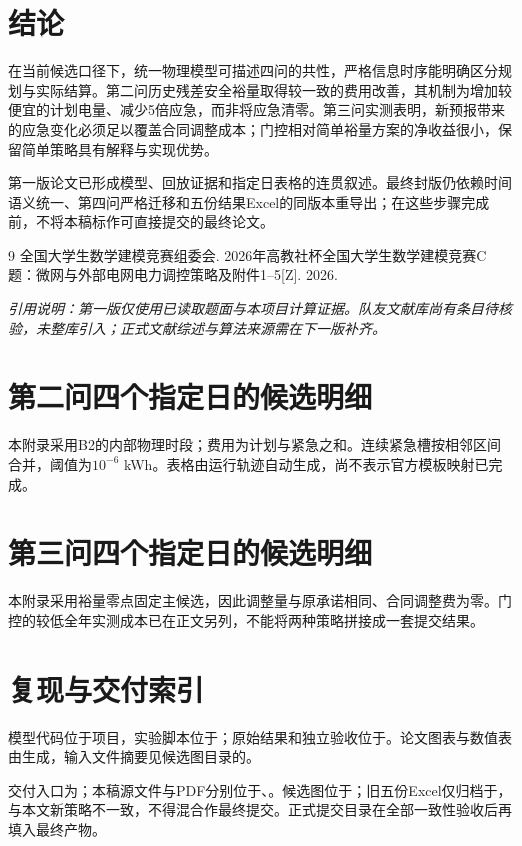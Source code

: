 \documentclass[UTF8,a4paper,zihao=-4,fontset=fandol]{ctexart}
\begin{document}
\section{结论}
在当前候选口径下，统一物理模型可描述四问的共性，严格信息时序能明确区分规划与实际结算。第二问历史残差安全裕量取得较一致的费用改善，其机制为增加较便宜的计划电量、减少5倍应急，而非将应急清零。第三问实测表明，新预报带来的应急变化必须足以覆盖合同调整成本；门控相对简单裕量方案的净收益很小，保留简单策略具有解释与实现优势。

第一版论文已形成模型、回放证据和指定日表格的连贯叙述。最终封版仍依赖时间语义统一、第四问严格迁移和五份结果Excel的同版本重导出；在这些步骤完成前，不将本稿标作可直接提交的最终论文。

\begin{thebibliography}{9}
 全国大学生数学建模竞赛组委会. 2026年高教社杯全国大学生数学建模竞赛C题：微网与外部电网电力调控策略及附件1--5[Z]. 2026.
\end{thebibliography}
\noindent\textit{引用说明：第一版仅使用已读取题面与本项目计算证据。队友文献库尚有条目待核验，未整库引入；正式文献综述与算法来源需在下一版补齐。}

\appendix
\section{第二问四个指定日的候选明细}
本附录采用B2的内部物理时段；费用为计划与紧急之和。连续紧急槽按相邻区间合并，阈值为$10^{-6}$ kWh。表格由运行轨迹自动生成，尚不表示官方模板映射已完成。

\section{第三问四个指定日的候选明细}
本附录采用裕量零点固定主候选，因此调整量与原承诺相同、合同调整费为零。门控的较低全年实测成本已在正文另列，不能将两种策略拼接成一套提交结果。

\section{复现与交付索引}
模型代码位于项目，实验脚本位于；原始结果和独立验收位于。论文图表与数值表由生成，输入文件摘要见候选图目录的。

交付入口为；本稿源文件与PDF分别位于、。候选图位于；旧五份Excel仅归档于，与本文新策略不一致，不得混合作最终提交。正式提交目录在全部一致性验收后再填入最终产物。
\end{document}
